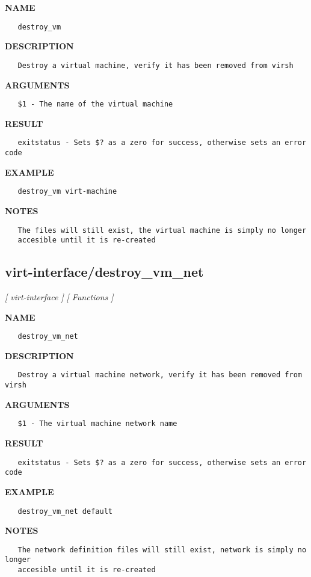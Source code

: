 \label{ch:robo36}
\label{ch:virt_interface_destroy_vm}
\textbf{NAME}
\begin{verbatim}
   destroy_vm
\end{verbatim}
\textbf{DESCRIPTION}
\begin{verbatim}
   Destroy a virtual machine, verify it has been removed from virsh
\end{verbatim}
\textbf{ARGUMENTS}
\begin{verbatim}
   $1 - The name of the virtual machine
\end{verbatim}
\textbf{RESULT}
\begin{verbatim}
   exitstatus - Sets $? as a zero for success, otherwise sets an error code
\end{verbatim}
\textbf{EXAMPLE}
\begin{verbatim}
   destroy_vm virt-machine
\end{verbatim}
\textbf{NOTES}
\begin{verbatim}
   The files will still exist, the virtual machine is simply no longer 
   accesible until it is re-created 
\end{verbatim}
\newpage
\subsection{virt-interface/destroy\_vm\_net}
\textsl{[ virt-interface ]}
\textsl{[ Functions ]}

\label{ch:robo37}
\label{ch:virt_interface_destroy_vm_net}
\textbf{NAME}
\begin{verbatim}
   destroy_vm_net
\end{verbatim}
\textbf{DESCRIPTION}
\begin{verbatim}
   Destroy a virtual machine network, verify it has been removed from virsh
\end{verbatim}
\textbf{ARGUMENTS}
\begin{verbatim}
   $1 - The virtual machine network name
\end{verbatim}
\textbf{RESULT}
\begin{verbatim}
   exitstatus - Sets $? as a zero for success, otherwise sets an error code
\end{verbatim}
\textbf{EXAMPLE}
\begin{verbatim}
   destroy_vm_net default
\end{verbatim}
\textbf{NOTES}
\begin{verbatim}
   The network definition files will still exist, network is simply no longer 
   accesible until it is re-created 
\end{verbatim}
\newpage
